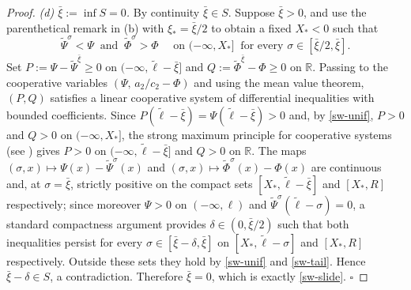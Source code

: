 \documentclass[reqno]{amsart}
\newcommand{\rev}[1]{#1}
\theoremstyle{plain}
\theoremstyle{definition}
\theoremstyle{remark}
\begin{document}
\begin{proof}
		\rev{\emph{(d) $\bar\xi:=\inf S=0$.} By continuity $\bar\xi\in S$. Suppose
		$\bar\xi>0$, and use the parenthetical remark in (b) with
		$\xi_*=\bar\xi/2$ to obtain a fixed $X_*<0$ such that
		\begin{equation}\label{sw-unif}
			\tilde\Psi^\sigma<\Psi \ \text{ and }\ \tilde\Phi^\sigma>\Phi
			\quad\text{ on }(-\infty,X_*]\ \text{ for every }\sigma\in[\bar\xi/2,\bar\xi].
		\end{equation}
		Set $P:=\Psi-\tilde\Psi^{\bar\xi}\ge0$ on
		$(-\infty,\tilde\ell-\bar\xi]$ and $Q:=\tilde\Phi^{\bar\xi}-\Phi\ge0$ on
		$\mathbb{R}$. Passing to the cooperative variables $(\Psi,\,a_2/c_2-\Phi)$
		and using the mean value theorem, $(P,Q)$ satisfies a linear cooperative
		system of differential inequalities with bounded coefficients. Since
		$P(\tilde\ell-\bar\xi)=\Psi(\tilde\ell-\bar\xi)>0$ and, by
		\eqref{sw-unif}, $P>0$ and $Q>0$ on $(-\infty,X_*]$, the strong maximum
		principle for cooperative systems (see \cite[Lemma~2.1]{MR3609207}) gives
		$P>0$ on $(-\infty,\tilde\ell-\bar\xi]$ and $Q>0$ on $\mathbb{R}$. The maps
		$(\sigma,x)\mapsto\Psi(x)-\tilde\Psi^{\sigma}(x)$ and
		$(\sigma,x)\mapsto\tilde\Phi^{\sigma}(x)-\Phi(x)$ are continuous and, at
		$\sigma=\bar\xi$, strictly positive on the compact sets
		$[X_*,\tilde\ell-\bar\xi]$ and $[X_*,R]$ respectively; since moreover
		$\Psi>0$ on $(-\infty,\ell)$ and $\tilde\Psi^{\sigma}(\tilde\ell-\sigma)=0$,
		a standard compactness argument provides $\delta\in(0,\bar\xi/2)$ such that
		both inequalities persist for every $\sigma\in[\bar\xi-\delta,\bar\xi]$ on
		$[X_*,\tilde\ell-\sigma]$ and $[X_*,R]$ respectively. Outside these sets they
		hold by \eqref{sw-unif} and \eqref{sw-tail}. Hence $\bar\xi-\delta\in S$, a
		contradiction. Therefore $\bar\xi=0$, which is exactly \eqref{sw-slide}.
		\hfill$\square$}


\end{proof}
\end{document}
